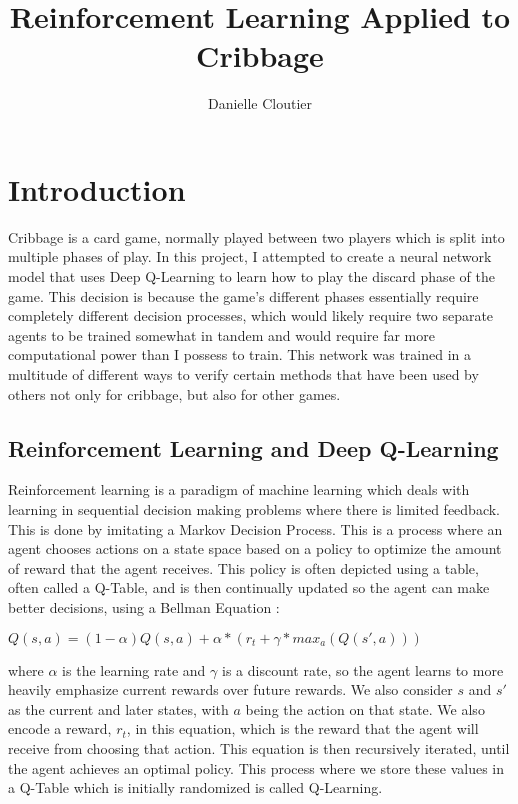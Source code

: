 \documentclass[]{article}
\title{Reinforcement Learning Applied to Cribbage}
\author{Danielle Cloutier}
\begin{document}
\maketitle

\section{Introduction}

Cribbage is a card game, normally played between two players which is split into multiple phases of play\cite{cribbage_rules}. In this project, I attempted to create a neural network model that uses Deep Q-Learning to learn how to play the discard phase of the game. This decision is because the game's different phases essentially require completely different decision processes, which would likely require two separate agents to be trained somewhat in tandem and would require far more computational power than I possess to train. This network was trained in a multitude of different ways to verify certain methods that have been used by others not only for cribbage, but also for other games. 

\subsection{Reinforcement Learning and Deep Q-Learning}

Reinforcement learning is a paradigm of machine learning which deals with learning in sequential decision making problems where there is limited feedback. This is done by imitating a Markov Decision Process. This is a process where an agent chooses actions on a state space based on a policy to optimize the amount of reward that the agent receives\cite{reinforcement_learning}. This policy is often depicted using a table, often called a Q-Table, and is then continually updated so the agent can make better decisions, using a Bellman Equation \cite{bellman}:

$Q(s, a) = (1 - \alpha)Q(s, a) + \alpha * (r_t + \gamma * max_a(Q(s', a)))$

where $\alpha$ is the learning rate and $\gamma$ is a discount rate, so the agent learns to more heavily emphasize current rewards over future rewards. We also consider $s$ and $s'$ as the current and later states, with $a$ being the action on that state. We also encode a reward, $r_t$, in this equation, which is the reward that the agent will receive from choosing that action. This equation is then recursively iterated, until the agent achieves an optimal policy. This process where we store these values in a Q-Table which is initially randomized is called Q-Learning\cite{reinforcement_learning}. 
\end{document}
